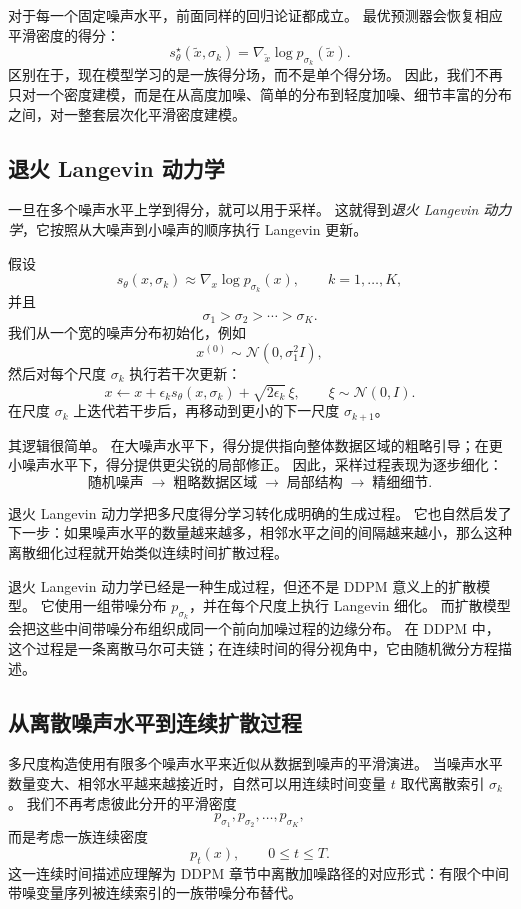 对于每一个固定噪声水平，前面同样的回归论证都成立。
最优预测器会恢复相应平滑密度的得分：
\[
s_\theta^\star(\tilde{x},\sigma_k)
=
\nabla_{\tilde{x}}\log p_{\sigma_k}(\tilde{x}).
\]
区别在于，现在模型学习的是一族得分场，而不是单个得分场。
因此，我们不再只对一个密度建模，而是在从高度加噪、简单的分布到轻度加噪、细节丰富的分布之间，对一整套层次化平滑密度建模。

\subsection{退火 Langevin 动力学}

一旦在多个噪声水平上学到得分，就可以用于采样。
这就得到\emph{退火 Langevin 动力学}，它按照从大噪声到小噪声的顺序执行 Langevin 更新。

假设
\[
s_\theta(x,\sigma_k)
\approx
\nabla_x\log p_{\sigma_k}(x),
\qquad
k=1,\dots,K,
\]
并且
\[
\sigma_1>\sigma_2>\cdots>\sigma_K.
\]
我们从一个宽的噪声分布初始化，例如
\[
x^{(0)}\sim\mathcal{N}(0,\sigma_1^2I),
\]
然后对每个尺度 $\sigma_k$ 执行若干次更新：
\[
\boxed{
x
\leftarrow
x
+
\epsilon_k s_\theta(x,\sigma_k)
+
\sqrt{2\epsilon_k}\,\xi,
\qquad
\xi\sim\mathcal{N}(0,I).
}
\]
在尺度 $\sigma_k$ 上迭代若干步后，再移动到更小的下一尺度 $\sigma_{k+1}$。

其逻辑很简单。
在大噪声水平下，得分提供指向整体数据区域的粗略引导；在更小噪声水平下，得分提供更尖锐的局部修正。
因此，采样过程表现为逐步细化：
\[
\text{随机噪声}
\;\longrightarrow\;
\text{粗略数据区域}
\;\longrightarrow\;
\text{局部结构}
\;\longrightarrow\;
\text{精细细节}.
\]

退火 Langevin 动力学把多尺度得分学习转化成明确的生成过程。
它也自然启发了下一步：如果噪声水平的数量越来越多，相邻水平之间的间隔越来越小，那么这种离散细化过程就开始类似连续时间扩散过程。

退火 Langevin 动力学已经是一种生成过程，但还不是 DDPM 意义上的扩散模型。
它使用一组带噪分布 $p_{\sigma_k}$，并在每个尺度上执行 Langevin 细化。
而扩散模型会把这些中间带噪分布组织成同一个前向加噪过程的边缘分布。
在 DDPM 中，这个过程是一条离散马尔可夫链；在连续时间的得分视角中，它由随机微分方程描述。

\subsection{从离散噪声水平到连续扩散过程}

多尺度构造使用有限多个噪声水平来近似从数据到噪声的平滑演进。
当噪声水平数量变大、相邻水平越来越接近时，自然可以用连续时间变量 $t$ 取代离散索引 $\sigma_k$。
我们不再考虑彼此分开的平滑密度
\[
p_{\sigma_1},p_{\sigma_2},\dots,p_{\sigma_K},
\]
而是考虑一族连续密度
\[
p_t(x),
\qquad
0\leq t\leq T.
\]
这一连续时间描述应理解为 DDPM 章节中离散加噪路径的对应形式：有限个中间带噪变量序列被连续索引的一族带噪分布替代。

